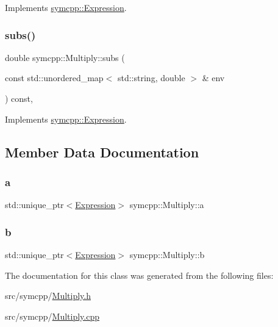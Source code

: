 Implements \mbox{\hyperlink{classsymcpp_1_1Expression_ab1fa6e55eea0682250d013f28db26cd2}{symcpp\+::\+Expression}}.

\mbox{\label{classsymcpp_1_1Multiply_a83a9396b931cd5010630f48ecd1bc2a1}} 
\subsubsection{\texorpdfstring{subs()}{subs()}}
{\footnotesize\ttfamily double symcpp\+::\+Multiply\+::subs (\begin{DoxyParamCaption}\item[{const std\+::unordered\+\_\+map$<$ std\+::string, double $>$ \&}]{env }\end{DoxyParamCaption}) const\hspace{0.3cm}{\ttfamily [override]}, {\ttfamily [virtual]}}



Implements \mbox{\hyperlink{classsymcpp_1_1Expression_aaef29b0afa2d6c21fe35f47a1be76134}{symcpp\+::\+Expression}}.



\subsection{Member Data Documentation}
\mbox{\label{classsymcpp_1_1Multiply_a8ed32ccb235cea51161dd0fd25ea130d}} 
\subsubsection{\texorpdfstring{a}{a}}
{\footnotesize\ttfamily std\+::unique\+\_\+ptr$<$\mbox{\hyperlink{classsymcpp_1_1Expression}{Expression}}$>$ symcpp\+::\+Multiply\+::a\hspace{0.3cm}{\ttfamily [private]}}

\mbox{\label{classsymcpp_1_1Multiply_a3d7a1b6e6e35585098b25f8b3a59e6ae}} 
\subsubsection{\texorpdfstring{b}{b}}
{\footnotesize\ttfamily std\+::unique\+\_\+ptr$<$\mbox{\hyperlink{classsymcpp_1_1Expression}{Expression}}$>$ symcpp\+::\+Multiply\+::b\hspace{0.3cm}{\ttfamily [private]}}



The documentation for this class was generated from the following files\+:\begin{DoxyCompactItemize}
\item 
src/symcpp/\mbox{\hyperlink{Multiply_8h}{Multiply.\+h}}\item 
src/symcpp/\mbox{\hyperlink{Multiply_8cpp}{Multiply.\+cpp}}\end{DoxyCompactItemize}
